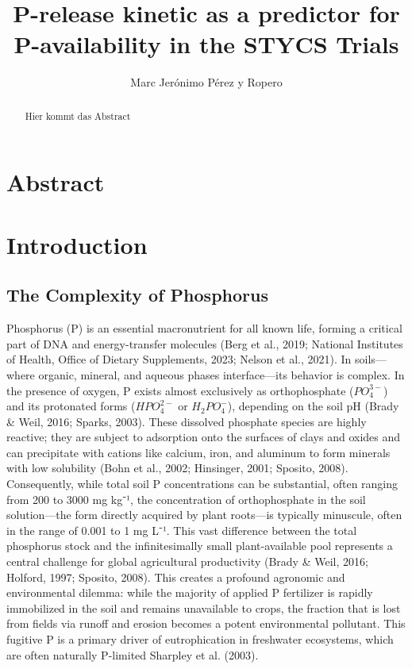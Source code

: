 \documentclass[
  a4paper,
]{article}
\title{P-release kinetic as a predictor for P-availability in the STYCS
Trials}
\author{Marc Jerónimo Pérez y Ropero}
\date{}
\begin{document}
\maketitle
\begin{abstract}
Hier kommt das Abstract
\end{abstract}

\tableofcontents
\cleardoublepage 
\pagestyle{fancy}


\section{Abstract}\label{abstract}

\section{Introduction}\label{introduction}

\subsection{The Complexity of
Phosphorus}\label{the-complexity-of-phosphorus}

Phosphorus (P) is an essential macronutrient for all known life, forming
a critical part of DNA and energy-transfer molecules (Berg et al., 2019;
National Institutes of Health, Office of Dietary Supplements, 2023;
Nelson et al., 2021). In soils---where organic, mineral, and aqueous
phases interface---its behavior is complex. In the presence of oxygen, P
exists almost exclusively as orthophosphate (\(PO_4^{3-}\)) and its
protonated forms (\(HPO_4^{2-}\) or \(H_2PO_4^{-}\)), depending on the
soil pH (Brady \& Weil, 2016; Sparks, 2003). These dissolved phosphate
species are highly reactive; they are subject to adsorption onto the
surfaces of clays and oxides and can precipitate with cations like
calcium, iron, and aluminum to form minerals with low solubility (Bohn
et al., 2002; Hinsinger, 2001; Sposito, 2008). Consequently, while total
soil P concentrations can be substantial, often ranging from 200 to 3000
mg kg⁻¹, the concentration of orthophosphate in the soil solution---the
form directly acquired by plant roots---is typically minuscule, often in
the range of 0.001 to 1 mg L⁻¹. This vast difference between the total
phosphorus stock and the infinitesimally small plant-available pool
represents a central challenge for global agricultural productivity
(Brady \& Weil, 2016; Holford, 1997; Sposito, 2008). This creates a
profound agronomic and environmental dilemma: while the majority of
applied P fertilizer is rapidly immobilized in the soil and remains
unavailable to crops, the fraction that is lost from fields via runoff
and erosion becomes a potent environmental pollutant. This fugitive P is
a primary driver of eutrophication in freshwater ecosystems, which are
often naturally P-limited Sharpley et al. (2003).
\end{document}
